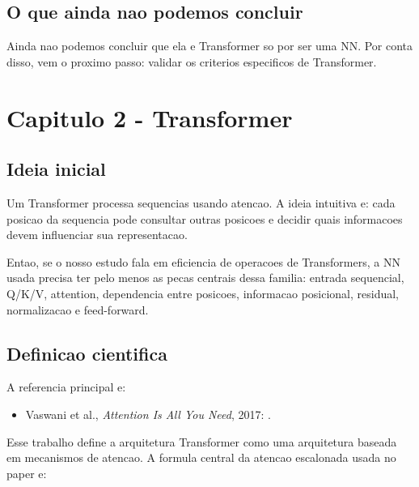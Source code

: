 \subsection{O que ainda nao podemos concluir}




Ainda nao podemos concluir que ela e Transformer so por ser uma NN. Por conta disso, vem o proximo passo: validar os criterios especificos de Transformer.



\section{Capitulo 2 - Transformer}



\subsection{Ideia inicial}





Um Transformer processa sequencias usando atencao. A ideia intuitiva e: cada posicao da sequencia pode consultar outras posicoes e decidir quais informacoes devem influenciar sua representacao.






Entao, se o nosso estudo fala em eficiencia de operacoes de Transformers, a NN usada precisa ter pelo menos as pecas centrais dessa familia: entrada sequencial, Q/K/V, attention, dependencia entre posicoes, informacao posicional, residual, normalizacao e feed-forward.



\subsection{Definicao cientifica}



A referencia principal e:


\begin{itemize}
\item Vaswani et al., \emph{Attention Is All You Need}, 2017:
.
\end{itemize}



Esse trabalho define a arquitetura Transformer como uma arquitetura baseada em mecanismos de atencao. A formula central da atencao escalonada usada no paper e:



